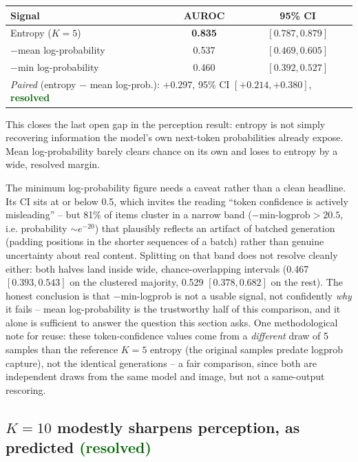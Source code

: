 \documentclass[11pt]{article}
\newcommand{\worked}[1]{\textcolor{darkgreen}{\textbf{#1}}}
\begin{document}
\begin{center}
\begin{tabular}{lcc}
\toprule
Signal & AUROC & 95\% CI \\
\midrule
Entropy ($K=5$) & \textbf{0.835} & $[0.787, 0.879]$ \\
$-$mean log-probability & 0.537 & $[0.469, 0.605]$ \\
$-$min log-probability & 0.460 & $[0.392, 0.527]$ \\
\midrule
\multicolumn{3}{l}{\emph{Paired} (entropy $-$ mean log-prob.): $+0.297$, 95\% CI $[+0.214, +0.380]$, \worked{resolved}} \\
\bottomrule
\end{tabular}
\end{center}

This closes the last open gap in the perception result: entropy is not simply
recovering information the model's own next-token probabilities already
expose. Mean log-probability barely clears chance on its own and loses to
entropy by a wide, resolved margin.

The minimum log-probability figure needs a caveat rather than a clean
headline. Its CI sits at or below 0.5, which invites the reading ``token
confidence is actively misleading'' -- but 81\% of items cluster in a narrow
band ($-\text{min-logprob} > 20.5$, i.e. probability $\sim e^{-20}$) that
plausibly reflects an artifact of batched generation (padding positions in the
shorter sequences of a batch) rather than genuine uncertainty about real
content. Splitting on that band does not resolve cleanly either: both halves
land inside wide, chance-overlapping intervals (0.467 $[0.393, 0.543]$ on the
clustered majority, 0.529 $[0.378, 0.682]$ on the rest). The honest
conclusion is that $-$min-logprob is not a usable signal, not confidently
\emph{why} it fails -- mean log-probability is the trustworthy half of this
comparison, and it alone is sufficient to answer the question this section
asks. One methodological note for reuse: these token-confidence values come
from a \emph{different} draw of 5 samples than the reference $K=5$ entropy
(the original samples predate logprob capture), not the identical generations
-- a fair comparison, since both are independent draws from the same
model and image, but not a same-output rescoring.

\subsection{$K=10$ modestly sharpens perception, as predicted \worked{(resolved)}}
\end{document}
